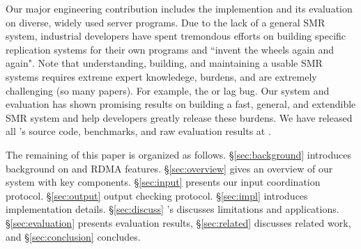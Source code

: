 Our major engineering contribution includes the \xxx implemention and its 
evaluation on \nprog diverse, widely used server programs. Due to the lack of a 
general SMR system, industrial developers have spent tremondous efforts on 
building specific replication systems for their own programs and ``invent the 
wheels again and again". Note that understanding, building, and maintaining a 
usable SMR systems requires extreme expert knowledege, burdens, and are 
extremely challenging (so many \paxos papers). For example, the \redis or 
\memcached lag bug. Our \xxx system and evaluation has shown promising results 
on building a fast, general, and extendible SMR system and help developers 
greatly release these burdens. We have released all \xxx's source code, 
benchmarks, and raw evaluation results at \github.

The remaining of this paper is organized as follows. \S\ref{sec:background} 
introduces background on \paxos and RDMA features. \S\ref{sec:overview} gives 
an overview of our \xxx system with key components. \S\ref{sec:input} presents 
our input coordination protocol. \S\ref{sec:output} output checking 
protocol. \S\ref{sec:impl} introduces implementation details.  
\S\ref{sec:discuss} \xxx's discusses limitations and applications. 
\S\ref{sec:evaluation} presents evaluation results, \S\ref{sec:related} 
discusses related work, and \S\ref{sec:conclusion} concludes.   